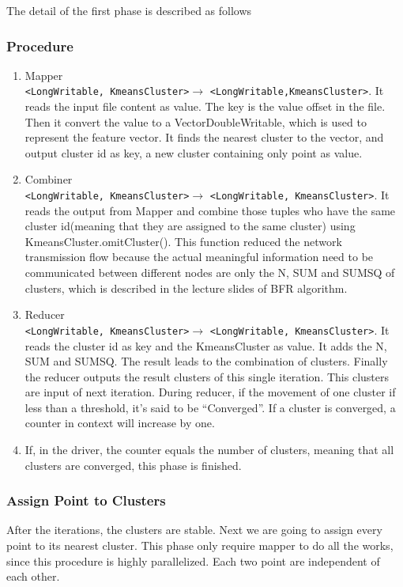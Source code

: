 \documentclass[a4paper,11pt]{article}
\begin{document}
The detail of the first phase is described as follows
\subsubsection{Procedure}
\begin{enumerate}
  \item Mapper\\\verb|<LongWritable, KmeansCluster>|$\rightarrow$
  \verb|<LongWritable,KmeansCluster>|. It reads the input file content as value.
  The key is the value offset in the file. Then it convert the value to a
  VectorDoubleWritable, which is used to represent the feature vector. It finds
  the nearest cluster to the vector, and output cluster id as key, a new cluster
  containing only point as value.
  \item Combiner\\\verb|<LongWritable, KmeansCluster>|$\rightarrow$
  \verb|<LongWritable, KmeansCluster>|. It reads the output from Mapper and
  combine those tuples who have the same cluster id(meaning that they are
  assigned to the same cluster) using KmeansCluster.omitCluster(). This function
  reduced the network transmission flow because the actual meaningful
  information need to be communicated between different nodes are only the N,
  SUM and SUMSQ of clusters, which is described in the lecture slides of BFR 
  algorithm. 
  \item Reducer\\\verb|<LongWritable, KmeansCluster>|$\rightarrow$
  \verb|<LongWritable, KmeansCluster>|. It reads the cluster id as key and the
  KmeansCluster as value. It adds the N, SUM and SUMSQ. The result leads to the
  combination of clusters. Finally the reducer outputs the result clusters of
  this single iteration. This clusters are input of next iteration. During
  reducer, if the movement of one cluster if less than a threshold, it's said
  to be ``Converged''. If a cluster is converged, a counter in context will
  increase by one.
  \item If, in the driver, the counter equals the number of clusters, meaning
  that all clusters are converged, this phase is finished.
\end{enumerate} 
\subsubsection{Assign Point to Clusters}
After the iterations, the clusters are stable. Next we are going to assign every
point to its nearest cluster. This phase only require mapper to do all the
works, since this procedure is highly parallelized. Each two point are
independent of each other.
\end{document}
